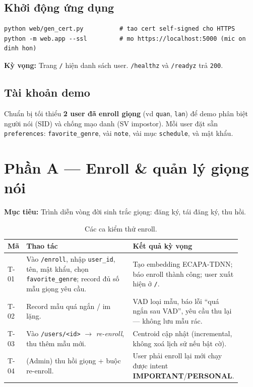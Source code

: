 \documentclass[12pt,a4paper]{article}
\newcommand{\role}[1]{\par\smallskip\noindent\textbf{\textcolor{hdr}{Mục tiêu:}} #1\par\smallskip}
\newcommand{\expect}[1]{\par\noindent\textbf{\textcolor{accent}{Kỳ vọng:}} #1\par}
\newcommand{\imp}{\textcolor{importantc}{\textbf{IMPORTANT}}}
\newcommand{\per}{\textcolor{personalc}{\textbf{PERSONAL}}}
\begin{document}
\subsection{Khởi động ứng dụng}
\begin{lstlisting}
python web/gen_cert.py          # tao cert self-signed cho HTTPS
python -m web.app --ssl         # mo https://localhost:5000 (mic on dinh hon)
\end{lstlisting}
\expect{Trang \texttt{/} hiện danh sách user. \texttt{/healthz} và \texttt{/readyz}
trả \texttt{200}.}

\subsection{Tài khoản demo}
Chuẩn bị tối thiểu \textbf{2 user đã enroll giọng} (vd \texttt{quan}, \texttt{lan})
để demo phân biệt người nói (SID) và chống mạo danh (SV impostor). Mỗi user đặt
sẵn \texttt{preferences}: \texttt{favorite\_genre}, vài \texttt{note}, vài mục
\texttt{schedule}, và mật khẩu.

\section{Phần A --- Enroll \& quản lý giọng nói}
\role{Trình diễn vòng đời sinh trắc giọng: đăng ký, tái đăng ký, thu hồi.}

\begin{table}[H]
\centering\small
\caption{Các ca kiểm thử enroll.}
\begin{tabular}{p{0.07\linewidth}p{0.49\linewidth}p{0.36\linewidth}}
\toprule
\textbf{Mã} & \textbf{Thao tác} & \textbf{Kết quả kỳ vọng} \\
\midrule
T-01 & Vào \texttt{/enroll}, nhập \texttt{user\_id}, tên, mật khẩu, chọn
\texttt{favorite\_genre}; record đủ số mẫu giọng yêu cầu. & Tạo embedding
ECAPA-TDNN; báo enroll thành công; user xuất hiện ở \texttt{/}. \\
T-02 & Record mẫu quá ngắn / im lặng. & VAD loại mẫu, báo lỗi ``quá ngắn sau
VAD'', yêu cầu thu lại --- không lưu mẫu rác. \\
T-03 & Vào \texttt{/users/<id>} $\to$ \emph{re-enroll}, thu thêm mẫu mới. &
Centroid cập nhật (incremental, không xoá lịch sử nếu bật cờ). \\
T-04 & (Admin) thu hồi giọng + buộc re-enroll. & User phải enroll lại mới chạy
được intent \imp{}/\per{}. \\
\bottomrule
\end{tabular}
\end{table}
\end{document}

